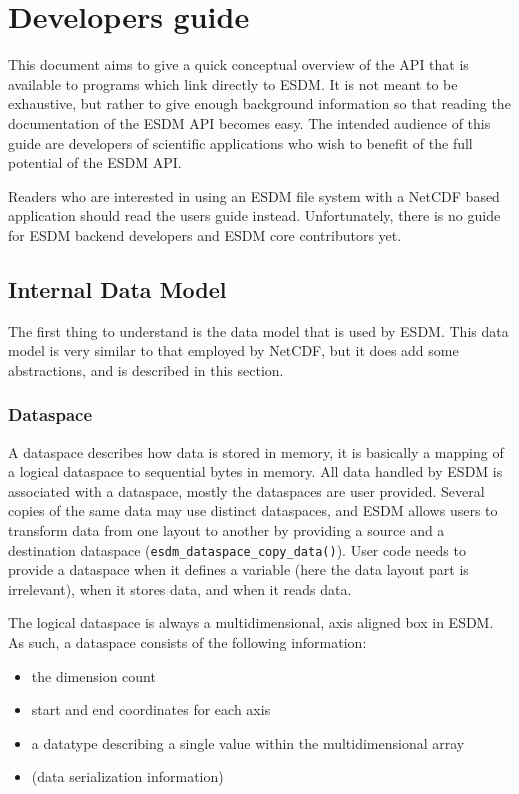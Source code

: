 \section{Developers guide}
This document aims to give a quick conceptual overview of the API that is available to programs which link directly to ESDM. 
It is not meant to be exhaustive, but rather to give enough background information so that reading the documentation of the ESDM API becomes easy. 
The intended audience of this guide are developers of scientific applications who wish to benefit of the full potential of the ESDM API.

Readers who are interested in using an ESDM file system with a NetCDF based application should read the users guide instead. 
Unfortunately, there is no guide for ESDM backend developers and ESDM core contributors yet.

\subsection{Internal Data Model}

The first thing to understand is the data model that is used by ESDM.
This data model is very similar to that employed by NetCDF, but it does add some abstractions, and is described in this section.

\subsubsection{Dataspace}
\label{sec:user-guides:data-space}

A dataspace describes how data is stored in memory, it is basically a mapping of a logical dataspace to sequential bytes in memory. 
All data handled by ESDM is associated with a dataspace, mostly the dataspaces are user provided. 
Several copies of the same data may use distinct dataspaces, and ESDM allows users to transform data from one layout to another by providing a source and a destination dataspace (\lstinline|esdm_dataspace_copy_data()|). 
User code needs to provide a dataspace when it defines a variable (here the data layout part is irrelevant), when it stores data, and when it reads data.

The logical dataspace is always a multidimensional, axis aligned box in ESDM. 
As such, a dataspace consists of the following information:

\begin{itemize}
  \item the dimension count
  \item start and end coordinates for each axis
  \item a datatype describing a single value within the multidimensional array
  \item (data serialization information)
\end{itemize}

